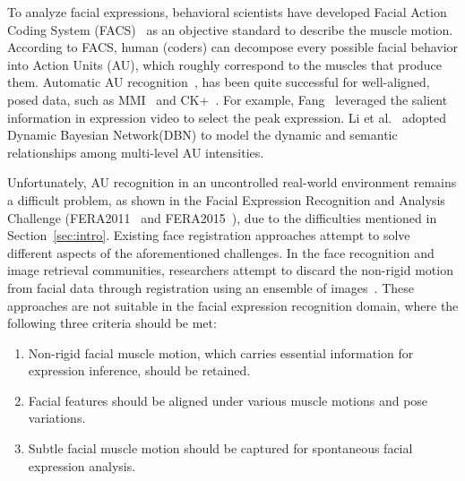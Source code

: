 \documentclass[review]{elsarticle}
\begin{document}
To analyze facial expressions, behavioral scientists have developed Facial Action Coding System (FACS)~\cite{Ekman78} as an objective standard to describe the muscle motion. According to FACS, human (coders) can decompose every possible facial behavior into Action Units (AU), which roughly correspond to the muscles that produce them. Automatic AU recognition~\cite{Zhao_PAMI07}\cite{Valstar_SMCB12}, has been quite successful for well-aligned, posed data, such as MMI~\cite{Pantic_ICME05} and CK+~\cite{Kanade_FG00}. For example, Fang~\cite{Fang_PR14} leveraged the salient information in expression video to select the peak expression. Li et al.~\cite{Li_PR15} adopted Dynamic Bayesian Network(DBN) to model the dynamic and semantic relationships among multi-level AU intensities.

Unfortunately, AU recognition in an uncontrolled real-world environment remains a difficult problem, as shown in the Facial Expression Recognition and Analysis Challenge (FERA2011~\cite{Valstar_FERA11} and FERA2015~\cite{FERA15}), due to the difficulties mentioned in Section~\ref{sec:intro}. Existing face registration approaches attempt to solve different aspects of the aforementioned challenges. In the face recognition and image retrieval communities, researchers attempt to discard the non-rigid motion from facial data through registration using an ensemble of images~\cite{LearnedMiller_PAMI06}\cite{Huang_ICCV07}\cite{Peng_PAMI12}. These approaches are not suitable in the facial expression recognition domain, where the following three criteria should be met:
\begin{enumerate}
	\item Non-rigid facial muscle motion, which carries essential information for expression inference, should be retained. 
	\item Facial features should be aligned under various muscle motions and pose variations. 
	\item Subtle facial muscle motion should be captured for spontaneous facial expression analysis.
\end{enumerate}
\end{document}
